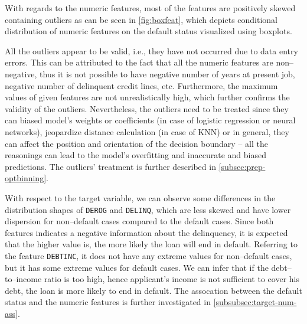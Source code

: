With regards to the numeric features, most of the features are positively skewed containing outliers as can be seen in \autoref{fig:boxfeat}, which depicts conditional distribution of numeric features on the default status visualized using boxplots.

All the outliers appear to be valid, i.e., they have not occurred due to data entry errors.
This can be attributed to the fact that all the numeric features are non--negative, thus it is not possible to have negative number of years at present job, negative number of delinquent credit lines, etc. 
Furthermore, the maximum values of given features are not unrealistically high, which further confirms the validity of the outliers.
Nevertheless, the outliers need to be treated since they can biased model's weights or coefficients (in case of logistic regression or neural networks), jeopardize distance calculation (in case of KNN) or in general, they can affect the position and orientation of the decision boundary -- all the reasonings can lead to the model's overfitting and inaccurate and biased predictions.
The outliers' treatment is further described in \autoref{subsec:prep-optbinning}.

With respect to the target variable, we can observe some differences in the distribution shapes of \texttt{DEROG} and \texttt{DELINQ}, which are less skewed and have lower dispersion for non--default cases compared to the default cases.
Since both features indicates a negative information about the delinquency, it is expected that the higher value is, the more likely the loan will end in default.
Referring to the feature \texttt{DEBTINC}, it does not have any extreme values for non--default cases, but it has some extreme values for default cases. We can infer that if the debt--to--income ratio is too high, hence applicant's income is not sufficient to cover his debt, the loan is more likely to end in default.
The assocation between the default status and the numeric features is further investigated in \autoref{subsubsec:target-num-ass}.

